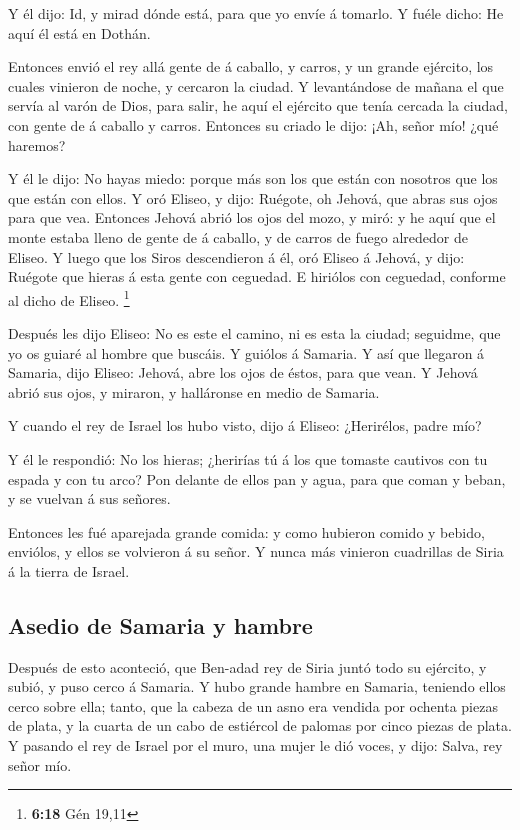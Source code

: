  Y él dijo: Id, y mirad dónde está, para que yo envíe á
tomarlo. Y fuéle dicho: He aquí él está en Dothán.

 Entonces envió el rey allá gente de á caballo, y carros,
y un grande ejército, los cuales vinieron de noche, y cercaron la
ciudad.  Y levantándose de mañana el que servía al varón
de Dios, para salir, he aquí el ejército que tenía cercada la ciudad,
con gente de á caballo y carros. Entonces su criado le dijo: ¡Ah, señor
mío! ¿qué haremos?

 Y él le dijo: No hayas miedo: porque más son los que
están con nosotros que los que están con ellos.  Y oró
Eliseo, y dijo: Ruégote, oh Jehová, que abras sus ojos para que vea.
Entonces Jehová abrió los ojos del mozo, y miró: y he aquí que el monte
estaba lleno de gente de á caballo, y de carros de fuego alrededor de
Eliseo.  Y luego que los Siros descendieron á él, oró
Eliseo á Jehová, y dijo: Ruégote que hieras á esta gente con ceguedad. E
hiriólos con ceguedad, conforme al dicho de Eliseo. \footnote{\textbf{6:18}
  Gén 19,11}

 Después les dijo Eliseo: No es este el camino, ni es
esta la ciudad; seguidme, que yo os guiaré al hombre que buscáis. Y
guiólos á Samaria.  Y así que llegaron á Samaria, dijo
Eliseo: Jehová, abre los ojos de éstos, para que vean. Y Jehová abrió
sus ojos, y miraron, y halláronse en medio de Samaria.

 Y cuando el rey de Israel los hubo visto, dijo á Eliseo:
¿Herirélos, padre mío?

 Y él le respondió: No los hieras; ¿herirías tú á los que
tomaste cautivos con tu espada y con tu arco? Pon delante de ellos pan y
agua, para que coman y beban, y se vuelvan á sus señores.

 Entonces les fué aparejada grande comida: y como
hubieron comido y bebido, enviólos, y ellos se volvieron á su señor. Y
nunca más vinieron cuadrillas de Siria á la tierra de Israel.

\hypertarget{asedio-de-samaria-y-hambre}{%
\subsection{Asedio de Samaria y
hambre}\label{asedio-de-samaria-y-hambre}}

 Después de esto aconteció, que Ben-adad rey de Siria
juntó todo su ejército, y subió, y puso cerco á Samaria. 
Y hubo grande hambre en Samaria, teniendo ellos cerco sobre ella; tanto,
que la cabeza de un asno era vendida por ochenta piezas de plata, y la
cuarta de un cabo de estiércol de palomas por cinco piezas de plata.
 Y pasando el rey de Israel por el muro, una mujer le dió
voces, y dijo: Salva, rey señor mío.


